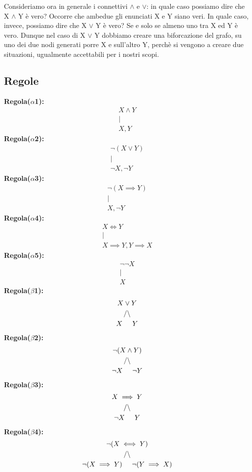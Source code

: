 Consideriamo ora in generale i connettivi $\land$ e $\lor$: in quale caso possiamo dire che X $\land$ Y è vero? Occorre che ambedue gli enunciati X e Y siano veri. In quale caso, invece, possiamo dire che X $\lor$ Y è vero? Se e solo se almeno uno tra X ed Y è vero. Dunque nel caso di X $\lor$ Y dobbiamo creare una biforcazione del grafo, su uno dei due nodi generati porre X e sull’altro Y, perchè si vengono a creare due situazioni, ugualmente accettabili per i nostri scopi.

\subsection*{Regole}

\textbf{Regola($\alpha$1):}
\begin{gather*}
    X \land Y\\
    |\\
    X, Y
\end{gather*}
\textbf{Regola($\alpha$2):}
\begin{gather*}
    \neg(X \lor Y)\\
    |\\
    \neg X, \neg Y
\end{gather*}
\textbf{Regola($\alpha$3):}
\begin{gather*}
    \neg(X \implies Y)\\
|\\
X, \neg Y
\end{gather*}
\textbf{Regola($\alpha$4):}
\begin{gather*}
    X \iff Y\\
|\\
X \implies Y, Y \implies X
\end{gather*}
\textbf{Regola($\alpha$5):}
\begin{gather*}
    \neg\neg X\\
|\\
X
\end{gather*}
\textbf{Regola($\beta$1):}
\begin{gather*}
    X \lor Y\\
/\backslash\\
X\hspace{0,5cm}Y
\end{gather*}
\textbf{Regola($\beta$2):}
\begin{gather*}
    \neg(X \land Y)\\
/ \backslash\\
\neg X\hspace{0,5cm}\neg Y
\end{gather*}
\textbf{Regola($\beta$3):}
\begin{gather*}
    X \implies Y\\
/ \backslash\\
\neg X\hspace{0,5cm}Y
\end{gather*}
\textbf{Regola($\beta$4):}
\begin{gather*}
    \neg(X \iff Y)\\
/ \backslash\\
\neg(X \implies Y)\hspace{0,5cm} \neg(Y \implies X)
\end{gather*}

